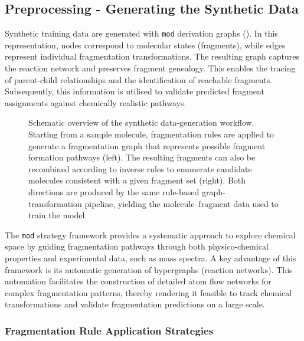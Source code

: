 \subsection{Preprocessing - Generating the Synthetic Data}

Synthetic training data are generated with \texttt{mod} derivation graphs ().
In this representation, nodes correspond to molecular states (fragments), while edges represent individual fragmentation transformations.
The resulting graph captures the reaction network and preserves fragment genealogy.
This enables the tracing of parent-child relationships and the identification of reachable fragments.
Subsequently, this information is utilised to validate predicted fragment assignments against chemically realistic pathways.

\begin{figure}
    \centering
    
    \caption[Schematic of the bidirectional fragmentation workflow]{
        Schematic overview of the synthetic data-generation workflow.
        Starting from a sample molecule, fragmentation rules are applied to generate a fragmentation graph
        that represents possible fragment formation pathways (left).
        The resulting fragments can also be recombined according to inverse rules to enumerate
        candidate molecules consistent with a given fragment set (right).
        Both directions are produced by the same rule-based graph-transformation pipeline,
        yielding the molecule--fragment data used to train the model.
    }
    \label{fig:data-gen-overview}
\end{figure}

The \texttt{mod} strategy framework provides a systematic approach to explore chemical space by guiding fragmentation pathways through both physico-chemical properties and experimental data, such as mass spectra. 
A key advantage of this framework is its automatic generation of hypergraphs (reaction networks).
This automation facilitates the construction of detailed atom flow networks for complex fragmentation patterns, thereby rendering it feasible to track chemical transformations and validate fragmentation predictions on a large scale.
\cite[p.~7]{Andersen2017}

\subsubsection{Fragmentation Rule Application Strategies}

